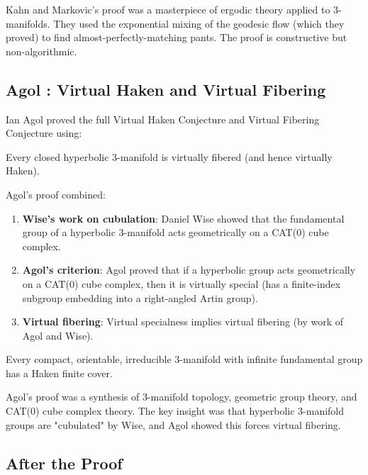 \begin{highlightbox}
Kahn and Markovic's proof was a masterpiece of ergodic theory applied to 3-manifolds. They used the exponential mixing of the geodesic flow (which they proved) to find almost-perfectly-matching pants. The proof is constructive but non-algorithmic.
\end{highlightbox}

\subsection{Agol \cite{agol2013}: Virtual Haken and Virtual Fibering}
Ian Agol \cite{agol2013} proved the full Virtual Haken Conjecture and Virtual Fibering Conjecture using:

\begin{theorem}
Every closed hyperbolic 3-manifold is virtually fibered (and hence virtually Haken).
\end{theorem}

Agol's proof combined:
\begin{enumerate}
\item \textbf{Wise's work on cubulation}: Daniel Wise \cite{wise2012} showed that the fundamental group of a hyperbolic 3-manifold acts geometrically on a CAT(0) cube complex.
\item \textbf{Agol's criterion}: Agol proved that if a hyperbolic group acts geometrically on a CAT(0) cube complex, then it is virtually special (has a finite-index subgroup embedding into a right-angled Artin group).
\item \textbf{Virtual fibering}: Virtual specialness implies virtual fibering (by work of Agol and Wise).
\end{enumerate}

\begin{theorem}
Every compact, orientable, irreducible 3-manifold with infinite fundamental group has a Haken finite cover.
\end{theorem}

\begin{highlightbox}
Agol's proof was a synthesis of 3-manifold topology, geometric group theory, and CAT(0) cube complex theory. The key insight was that hyperbolic 3-manifold groups are "cubulated" by Wise, and Agol showed this forces virtual fibering.
\end{highlightbox}

\subsection{After the Proof}

